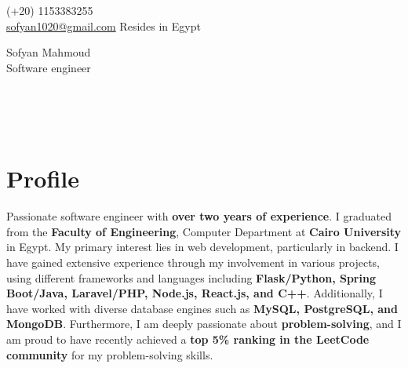 \documentclass[a4,10pt]{article}
\begin{document}
\begin{center}
    \begin{minipage}[b]{0.24\textwidth}
            \large (+20) 1153383255 \\
            \large \href{mailto:sofyan1020@gmail.com}{sofyan1020@gmail.com} 
            \large Resides in Egypt
    \end{minipage}%
    \begin{minipage}[b]{0.5\textwidth}
            \centering
            {\Huge Sofyan Mahmoud} \\ %
            \vspace{0.1cm}
            {\color{UI_blue} \Large{Software engineer}} \\
    \end{minipage}%
    \begin{minipage}[b]{0.24\textwidth}
            \flushright \large  %
            \href{https://www.linkedin.com/in/sofyanmahmoud0000/}{\color{blue}{LinkedIn} } \\
            \href{https://leetcode.com/u/sofyan1020/}{\color{blue}{Leetcode}} \\ 
            \href{https://github.com/sofyanmahmoud0000}{\color{blue}{Github}} \\ 
    \end{minipage}   
    
\vspace{-0.15cm} 
\end{center}
\vspace{-0.25cm}

\section{Profile }
Passionate software engineer with \textbf{over two years of experience}. I graduated from the \textbf{Faculty of Engineering}, 
Computer Department at \textbf{Cairo University} in Egypt. My primary interest lies in web development, 
particularly in backend. I have gained extensive experience through my involvement in various projects, 
using different frameworks and languages including \textbf{Flask/Python, Spring Boot/Java, 
Laravel/PHP, Node.js, React.js, and C++}. Additionally, I have worked with diverse database engines such as \textbf{MySQL, 
PostgreSQL, and MongoDB}. Furthermore, I am deeply passionate about \textbf{problem-solving}, 
and I am proud to have recently achieved a \textbf{top 5\% ranking in the LeetCode community} for my problem-solving skills. \\
\end{document}

